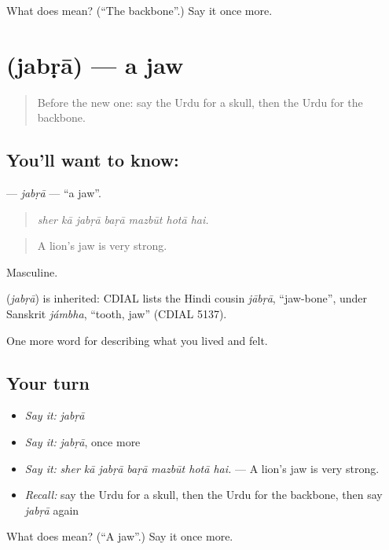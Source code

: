 \begin{tcolorbox}[breakable,colback=teal!4,colframe=teal!35!black,title={Before you move on}]
What does  mean? (\textquotedblleft{}The backbone\textquotedblright{}.) Say it once more.
\end{tcolorbox}
\section[\texorpdfstring{\ur{جبڑا} (jabṛā)}{جبڑا (jabṛā)}]{ (jabṛā) — a jaw}

\label{lesson:UR-C465-jabra}



\begin{quote}
Before the new one: say the Urdu for a skull, then the Urdu for the backbone.
\end{quote}

\subsection*{You'll want to know: }
\textbf{} — \emph{jabṛā} — \textquotedblleft{}a jaw\textquotedblright{}.

\begin{quote}
      
\end{quote}

\begin{quote}
\emph{sher kā jabṛā baṛā mazbūt hotā hai.}
\end{quote}

\begin{quote}
A lion's jaw is very strong.
\end{quote}

Masculine.

\begin{cousinweb}
\textbf{} (\emph{jabṛā}) is inherited: CDIAL lists the Hindi cousin \emph{jābṛā}, \textquotedblleft{}jaw-bone\textquotedblright{}, under Sanskrit \emph{jámbha}, \textquotedblleft{}tooth, jaw\textquotedblright{} (CDIAL 5137).
\end{cousinweb}

\begin{grammarlens}[title={What you've built}]
One more word for describing what you lived and felt.
\end{grammarlens}

\subsection*{Your turn}
\begin{itemize}
\raggedright
  \item \emph{Say it:} \emph{jabṛā}
  \item \emph{Say it:} \emph{jabṛā}, once more
  \item \emph{Say it:} \emph{sher kā jabṛā baṛā mazbūt hotā hai.} — A lion's jaw is very strong.
  \item \emph{Recall:} say the Urdu for a skull, then the Urdu for the backbone, then say \emph{jabṛā} again
\end{itemize}

\begin{tcolorbox}[breakable,colback=teal!4,colframe=teal!35!black,title={Before you move on}]
What does  mean? (\textquotedblleft{}A jaw\textquotedblright{}.) Say it once more.
\end{tcolorbox}
